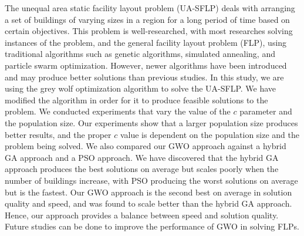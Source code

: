
The unequal area static facility layout problem (UA-SFLP) deals with arranging a set of buildings of varying sizes in a region for a long period of time based on certain objectives. This problem is well-researched, with most researches solving instances of the problem, and the general facility layout problem (FLP), using traditional algorithms such as genetic algorithms, simulated annealing, and particle swarm optimization. However, newer algorithms have been introduced and may produce better solutions than previous studies. In this study, we are using the grey wolf optimization algorithm to solve the UA-SFLP. We have modified the algorithm in order for it to produce feasible solutions to the problem. We conducted experiments that vary the value of the $c$ parameter and the population size. Our experiments show that a larger population size produces better results, and the proper $c$ value is dependent on the population size and the problem being solved. We also compared our GWO approach against a hybrid GA approach and a PSO approach. We have discovered that the hybrid GA approach produces the best solutions on average but scales poorly when the number of buildings increase, with PSO producing the worst solutions on average but is the fastest. Our GWO approach is the second best on average in solution quality and speed, and was found to scale better than the hybrid GA approach. Hence, our approach provides a balance between speed and solution quality. Future studies can be done to improve the performance of GWO in solving FLPs.